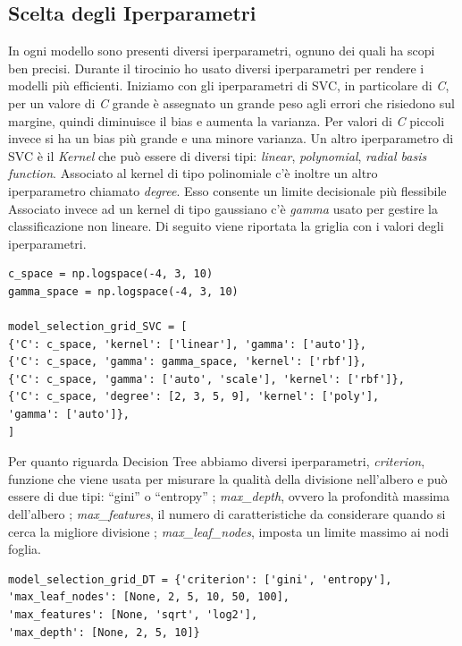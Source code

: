 \documentclass[12pt,italian]{report}
\begin{document}
\subsection{Scelta degli Iperparametri}
\label{iperparametri}
In ogni modello sono presenti diversi iperparametri, ognuno dei quali ha scopi ben precisi. Durante il tirocinio ho usato diversi iperparametri per rendere i modelli più efficienti.
Iniziamo con gli iperparametri di SVC, in particolare di \emph{C}, per un valore di \emph{C} grande è assegnato un grande peso agli errori che risiedono sul margine, quindi diminuisce il bias e aumenta la varianza. Per valori di \emph{C} piccoli invece si ha un bias più grande e una minore varianza. 
Un altro iperparametro di SVC è il \emph{Kernel} che può essere di diversi tipi: \emph{linear}, \emph{polynomial}, \emph{radial basis function}. Associato al kernel di tipo polinomiale c'è inoltre un altro iperparametro chiamato \emph{degree}. Esso consente un limite decisionale più flessibile 
Associato invece ad un kernel di tipo gaussiano c'è \emph{gamma} usato per gestire la classificazione non lineare.
Di seguito viene riportata la griglia con i valori degli iperparametri.

\begin{lstlisting}[frame=single, basicstyle=\footnotesize]
c_space = np.logspace(-4, 3, 10)
gamma_space = np.logspace(-4, 3, 10)

model_selection_grid_SVC = [
{'C': c_space, 'kernel': ['linear'], 'gamma': ['auto']},
{'C': c_space, 'gamma': gamma_space, 'kernel': ['rbf']},
{'C': c_space, 'gamma': ['auto', 'scale'], 'kernel': ['rbf']},
{'C': c_space, 'degree': [2, 3, 5, 9], 'kernel': ['poly'],
'gamma': ['auto']},
]
\end{lstlisting}

Per quanto riguarda Decision Tree abbiamo diversi iperparametri, \emph{criterion}, funzione che viene usata per misurare la qualità della divisione nell'albero e può essere di due tipi: ``gini'' o ``entropy'' \cite{scikit-learn}; \emph{max\_depth}, ovvero la profondità massima dell'albero \cite{scikit-learn}; \emph{max\_features}, il numero di caratteristiche da considerare quando si cerca la migliore divisione \cite{scikit-learn}; \emph{max\_leaf\_nodes}, imposta un limite massimo ai nodi foglia.
\begin{lstlisting}[frame=single, basicstyle=\footnotesize]
model_selection_grid_DT = {'criterion': ['gini', 'entropy'],
'max_leaf_nodes': [None, 2, 5, 10, 50, 100],
'max_features': [None, 'sqrt', 'log2'],
'max_depth': [None, 2, 5, 10]}
\end{lstlisting}
\end{document}
